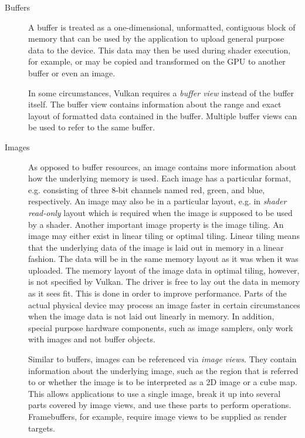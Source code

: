     \begin{description}
      \item[Buffers]
        A buffer is treated as a one-dimensional, unformatted, contiguous block of memory that can be used by the \gls{application} to upload general purpose data to the device.
        This data may then be used during shader execution, for example, or may be copied and transformed on the GPU to another buffer or even an image.

        In some circumstances, Vulkan requires a \textit{buffer view} instead of the buffer itself.
        The buffer view contains information about the range and exact layout of formatted data contained in the buffer.
        Multiple buffer views can be used to refer to the same buffer.

      \item[Images]
        As opposed to buffer resources, an image contains more information about how the underlying memory is used.
        Each image has a particular format, e.g. consisting of three 8-bit channels named red, green, and blue, respectively.
        An image may also be in a particular layout, e.g. in \textit{shader read-only} layout which is required when the image is supposed to be used by a shader.
        Another important image property is the image tiling.
        An image may either exist in linear tiling or optimal tiling.
        Linear tiling means that the underlying data of the image is laid out in memory in a linear fashion.
        The data will be in the same memory layout as it was when it was uploaded.
        The memory layout of the image data in optimal tiling, however, is not specified by Vulkan.
        The \gls{driver} is free to lay out the data in memory as it sees fit.
        This is done in order to improve performance.
        Parts of the actual physical device may process an image faster in certain circumstances when the image data is not laid out linearly in memory.
        In addition, special purpose hardware components, such as image samplers, only work with images and not buffer objects.

        Similar to buffers, images can be referenced via \textit{image views}.
        They contain information about the underlying image, such as the region that is referred to or whether the image is to be interpreted as a 2D image or a cube map.
        This allows applications to use a single image, break it up into several parts covered by image views, and use these parts to perform operations.
        Framebuffers, for example, require image views to be supplied as render targets.
    \end{description}


